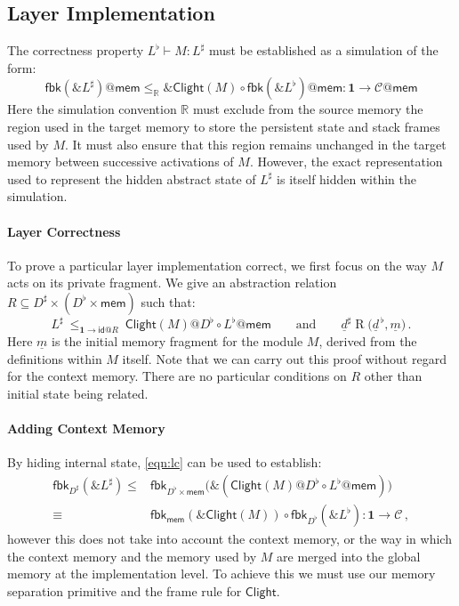 \documentclass[acmsmall,screen,review,anonymous]{acmart}
\newcommand{\kw}[1]{\ensuremath{ \mathsf{#1} }}
\newcommand{\intl}[1]{\underline{#1}}
\begin{document}
{
\color{gray}
\subsection{Layer Implementation} %

The correctness property $L^\flat \vdash M : L^\sharp$
must be established as a simulation of the form:
\[
  \kw{fbk}(\&L^\sharp)@\kw{mem}
  \le_\mathbb{R}
  \&\kw{Clight}(M) \circ \kw{fbk}(\&L^\flat)@\kw{mem}
  :
  \mathbf{1} \rightarrow \mathcal{C}@\kw{mem}
\]
Here the simulation convention $\mathbb{R}$
must exclude from the source memory
the region used in the target memory
to store the persistent state and stack frames used by $M$.
It must also ensure that
this region remains unchanged in the target memory
between successive activations of $M$.
However,
the exact representation used
to represent the hidden abstract state of $L^\sharp$
is itself hidden within the simulation.

\paragraph{Layer Correctness}

To prove a particular layer implementation correct,
we first focus on the way $M$ acts on its private fragment.
We give an abstraction relation
$R \subseteq D^\sharp \times (D^\flat \times \kw{mem})$
such that:
\begin{equation}
  L^\sharp
  \:\le_{\mathbf{1} \rightarrow \kw{id}@R}\:
  \kw{Clight}(M)@D^\flat \circ L^\flat@\kw{mem}
  \qquad \text{and} \qquad
  \intl{d}^\sharp \mathrel{R} \big( \intl{d}^{\,\flat}, \intl{m} \big)
  \,.
  \label{eqn:lc}
\end{equation}
Here $\intl{m}$ is the initial memory fragment for the module $M$,
derived from the definitions within $M$ itself.
Note that we can carry out this proof without regard for the context memory.
There are no particular conditions on $R$ other than
initial state being related.

\paragraph{Adding Context Memory}

By hiding internal state,
\autoref{eqn:lc} can be used to establish:
\begin{align*}
  \kw{fbk}_{D^\sharp}(\&L^\sharp) \le {} &
  \kw{fbk}_{D^\flat \times \kw{mem}} \big(
    \&(\kw{Clight}(M)@D^\flat \circ L^\flat@\kw{mem})
    \big) \\ \equiv {} &
  \kw{fbk}_\kw{mem}(\&\kw{Clight}(M)) \circ \kw{fbk}_{D^\flat}(\&L^\flat)
  : \mathbf{1} \rightarrow \mathcal{C}
  \,,
\end{align*}
however this does not take into account the context memory,
or the way in which the context memory and the memory used by $M$
are merged into the global memory
at the implementation level.
To achieve this we must use our memory separation primitive
and the frame rule for $\kw{Clight}$.
}
\end{document}
